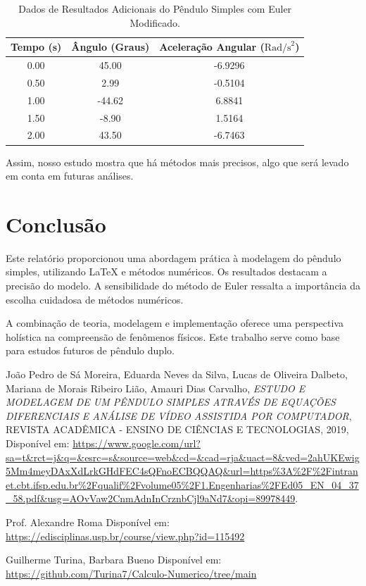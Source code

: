 \documentclass[a4paper, 10pt]{article}
\begin{document}
\begin{table}[h]
    \centering
    \begin{tabular}{|c|c|c|}
        \hline
        \textbf{Tempo (s)} & \textbf{Ângulo (Graus)} & \textbf{Aceleração Angular (\( \text{Rad/s}^2 \))} \\
        \hline
        0.00 & 45.00 & -6.9296 \\
        0.50 & 2.99 & -0.5104 \\
        1.00 & -44.62 & 6.8841 \\
        1.50 & -8.90 & 1.5164 \\
        2.00 & 43.50 & -6.7463 \\
        \hline
    \end{tabular}
    \caption{Dados de Resultados Adicionais do Pêndulo Simples com Euler Modificado.}
    \label{tab:resultados-adicionais}
\end{table}

Assim, nosso estudo mostra que há métodos mais precisos, algo que será levado em conta em futuras análises.

\section{Conclusão}
Este relatório proporcionou uma abordagem prática à modelagem do pêndulo simples, utilizando LaTeX e métodos numéricos. Os resultados destacam a precisão do modelo. A sensibilidade do método de Euler ressalta a importância da escolha cuidadosa de métodos numéricos.

A combinação de teoria, modelagem e implementação oferece uma perspectiva holística na compreensão de fenômenos físicos. Este trabalho serve como base para estudos futuros de pêndulo duplo.

\begin{thebibliography}{9}
    João Pedro de Sá Moreira, Eduarda Neves da Silva, Lucas de Oliveira Dalbeto, Mariana de Morais Ribeiro Lião, Amauri Dias Carvalho,
    \emph{ESTUDO E MODELAGEM DE UM PÊNDULO SIMPLES ATRAVÉS DE EQUAÇÕES DIFERENCIAIS E ANÁLISE DE VÍDEO ASSISTIDA POR COMPUTADOR},
    REVISTA ACADÊMICA - ENSINO DE CIÊNCIAS E TECNOLOGIAS, 2019,
    Disponível em: \url{https://www.google.com/url?sa=t&rct=j&q=&esrc=s&source=web&cd=&cad=rja&uact=8&ved=2ahUKEwig5Mm4meyDAxXdLrkGHdFEC4sQFnoECBQQAQ&url=https%3A%2F%2Fintranet.cbt.ifsp.edu.br%2Fqualif%2Fvolume05%2F1.Engenharias%2FEd05_EN_04_37_58.pdf&usg=AOvVaw2CnmAdnInCrznbCjl9aNd7&opi=89978449}.

    Prof. Alexandre Roma
    Disponível em: \url{https://edisciplinas.usp.br/course/view.php?id=115492}

    Guilherme Turina, Barbara Bueno
    Disponível em: \url{https://github.com/Turina7/Calculo-Numerico/tree/main}
\end{thebibliography}
\end{document}
